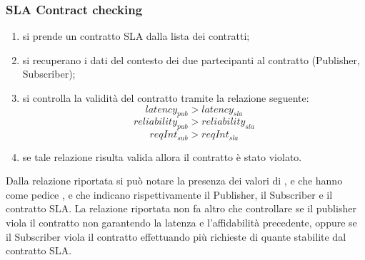 \subsubsection{SLA Contract checking}
\begin{enumerate}
	\item si prende un contratto SLA dalla lista dei contratti;
	\item si recuperano i dati del contesto dei due partecipanti al contratto (Publisher, Subscriber);
	\item si controlla la validità del contratto tramite la relazione seguente:
		$$
			latency_{pub} > latency_{sla}
		$$
		$$
			reliability_{pub} > reliability_{sla}
		$$
		$$
			reqInt_{sub} > reqInt_{sla}
		$$
	\item se tale relazione risulta valida allora il contratto è stato violato.
\end{enumerate}
Dalla relazione riportata si può notare la presenza dei valori di ,  e  che hanno come pedice ,  e  che indicano rispettivamente il Publisher, il Subscriber e il contratto SLA. La relazione riportata non fa altro che controllare se il publisher viola il contratto non garantendo la latenza e l'affidabilità precedente, oppure se il Subscriber viola il contratto effettuando più richieste di quante stabilite dal contratto SLA.
